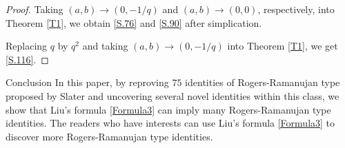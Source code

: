 \documentclass[reqno,12pt]{amsart}
\theoremstyle{remark}
\numberwithin{equation}{section}
\begin{document}
\begin{proof}
Taking $\left(a,b\right)\to\left(0,-1/q\right)$ and $\left(a,b\right)\to\left(0,0\right)$, respectively,  into Theorem \ref{T1}, we obtain \eqref{S.76} and \eqref{S.90} after simplication.

Replacing $q$ by $q^2$ and taking $\left(a,b\right)\to\left(0,-1/q\right)$ into Theorem \ref{T1}, we get \eqref{S.116}.
\end{proof}
\begin{section}{Conclusion}
In this paper,  by reproving  $75$ identities of Rogers-Ramanujan type proposed by Slater and  uncovering several novel identities within this class, we show  that Liu's formula \eqref{Formula3} can imply many Rogers-Ramanujan type identities.  The readers who have interests can use  Liu's formula \eqref{Formula3} to discover more Rogers-Ramanujan type identities.


\end{section}
\end{document}
